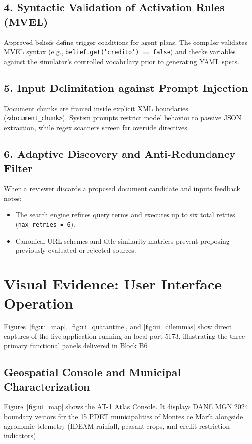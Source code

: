\documentclass[11pt,a4paper]{article}
\begin{document}
\subsection{4. Syntactic Validation of Activation Rules (MVEL)}
Approved beliefs define trigger conditions for agent plans. The compiler validates MVEL syntax (e.g., \texttt{belief.get('credito') == false}) and checks variables against the simulator's controlled vocabulary prior to generating YAML specs.

\subsection{5. Input Delimitation against Prompt Injection}
Document chunks are framed inside explicit XML boundaries (\texttt{<document\_chunk>}). System prompts restrict model behavior to passive JSON extraction, while regex scanners screen for override directives.

\subsection{6. Adaptive Discovery and Anti-Redundancy Filter}
When a reviewer discards a proposed document candidate and inputs feedback notes:
\begin{itemize}[leftmargin=*]
    \item The search engine refines query terms and executes up to six total retries (\texttt{max\_retries = 6}).
    \item Canonical URL schemes and title similarity matrices prevent proposing previously evaluated or rejected sources.
\end{itemize}

\section{Visual Evidence: User Interface Operation}

Figures~\ref{fig:ui_map}, \ref{fig:ui_quarantine}, and \ref{fig:ui_dilemmas} show direct captures of the live application running on local port 5173, illustrating the three primary functional panels delivered in Block B6.

\subsection{Geospatial Console and Municipal Characterization}
Figure~\ref{fig:ui_map} shows the AT-1 Atlas Console. It displays DANE MGN 2024 boundary vectors for the 15 PDET municipalities of Montes de María alongside agronomic telemetry (IDEAM rainfall, peasant crops, and credit restriction indicators).
\end{document}
